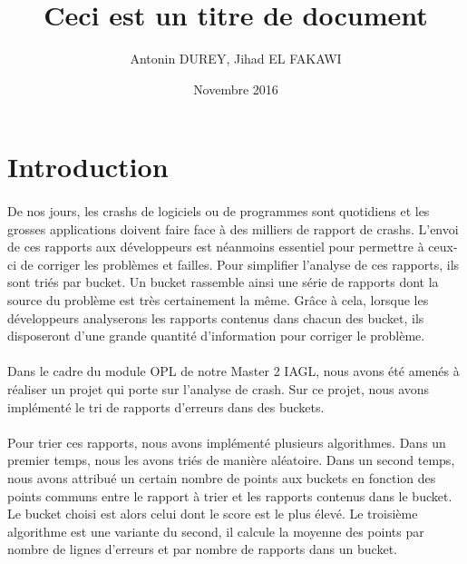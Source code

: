 \documentclass[10pt]{article}
\begin{document}
\title{Ceci est un titre de document}
\author{Antonin DUREY, Jihad EL FAKAWI}
\date{Novembre 2016}
\maketitle

\newpage

\tableofcontents

\newpage
\section*{Introduction}

\paragraph{}
De nos jours, les crashs de logiciels ou de programmes sont quotidiens et les grosses applications doivent faire face à des milliers de rapport de crashs. L’envoi de ces rapports aux développeurs est néanmoins essentiel pour permettre à ceux-ci de corriger les problèmes et failles. Pour simplifier l’analyse de ces rapports, ils sont triés par bucket. Un bucket rassemble ainsi une série de rapports dont la source du problème est très certainement la même. Grâce à cela, lorsque les développeurs analyserons les rapports contenus dans chacun des bucket, ils disposeront d’une grande quantité d’information pour corriger le problème.


\paragraph{}
Dans le cadre du module OPL de notre Master 2 IAGL, nous avons été amenés à réaliser un projet qui porte sur l’analyse de crash. Sur ce projet, nous avons implémenté le tri de rapports d’erreurs dans des buckets.
    
    
\paragraph{}
Pour trier ces rapports, nous avons implémenté plusieurs algorithmes. Dans un premier temps, nous les avons triés de manière aléatoire. Dans un second temps, nous avons attribué un certain nombre de points aux buckets en fonction des points communs entre le rapport à trier et les rapports contenus dans le bucket. Le bucket choisi est alors celui dont le score est le plus élevé. Le troisième algorithme est une variante du second, il calcule la moyenne des points par nombre de lignes d’erreurs et par nombre de rapports dans un bucket.
\end{document}
